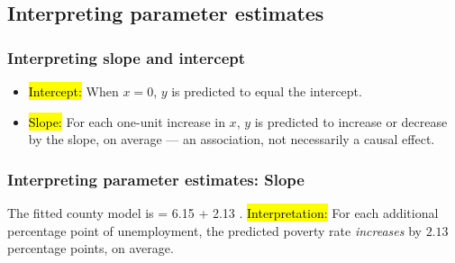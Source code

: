 \documentclass[slidestop,compress,mathserif]{beamer}
\def\[#1\]{\begin{align*}#1\end{align*}}
\begin{document}
\subsection{Interpreting parameter estimates}

\begin{frame}
\frametitle{Interpreting slope and intercept}

{
\begin{itemize}
\item \hl{Intercept:} When \(x=0\), \(y\) is predicted to equal the intercept.

\vspace{0.8em}

\item \hl{Slope:} For each one-unit increase in \(x\), \(y\) is predicted to increase or decrease by the slope, on average --- an association, not necessarily a causal effect.
\end{itemize}
}
{
\begin{center}
\end{center}
}

\end{frame}


\begin{frame}
\frametitle{Interpreting parameter estimates: Slope}
The fitted county model is
\[
\widehat{\mathrm{poverty}} = 6.15 + 2.13 \times {}.
\]
\hl{Interpretation:} For each additional percentage point of unemployment, the predicted poverty rate \emph{increases} by \(2.13\) percentage points, on average.

\end{frame}

\end{document}
